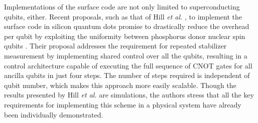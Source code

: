 Implementations of the surface code are not only limited to superconducting
qubits, either. Recent proposals, such as that of Hill \textit{et al.} , to
implement the surface code in silicon quantum dots promise to drastically reduce
the overhead per qubit by exploiting the uniformity between phosphorus donor
nuclear spin qubits \cite{silicon_surface_code}. Their proposal addresses the
requirement for repeated stabilizer measurement by implementing shared control
over all the qubits, resulting in a control architecture capable of executing
the full sequence of CNOT gates for all ancilla qubits in just four steps. The
number of steps required is independent of qubit number, which makes this
approach more easily scalable. Though the results presented by Hill \textit{et
  al.} are simulations, the authors stress that all the key requirements for
implementing this scheme in a physical system have already been individually
demonstrated.

